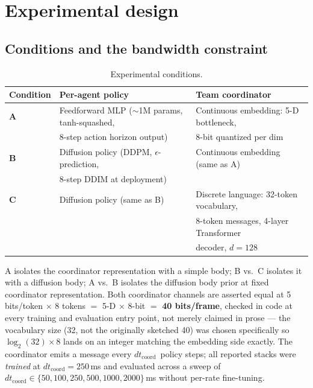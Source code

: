 \documentclass[11pt]{article}
\newcommand{\dtcoord}{\ensuremath{dt_{\mathrm{coord}}}}
\begin{document}
\section{Experimental design}

\subsection{Conditions and the bandwidth constraint}
\label{sec:conditions}

\begin{table}[ht]
\centering
\small
\begin{tabular}{@{}lll@{}}
\toprule
Condition & Per-agent policy & Team coordinator \\
\midrule
\textbf{A} & Feedforward MLP ($\sim$1M params, tanh-squashed, & Continuous embedding: 5-D bottleneck, \\
           & 8-step action horizon output)                    & 8-bit quantized per dim \\
\textbf{B} & Diffusion policy (DDPM, $\epsilon$-prediction,   & Continuous embedding (same as A) \\
           & 8-step DDIM at deployment)                       & \\
\textbf{C} & Diffusion policy (same as B)                     & Discrete language: 32-token vocabulary, \\
           &                                                  & 8-token messages, 4-layer Transformer \\
           &                                                  & decoder, $d=128$ \\
\bottomrule
\end{tabular}
\caption{Experimental conditions.}
\label{tab:conditions}
\end{table}

A isolates the coordinator representation with a simple body; B vs.\ C
isolates it with a diffusion body; A vs.\ B isolates the diffusion body
prior at fixed coordinator representation. Both coordinator channels are
asserted equal at 5 bits/token $\times$ 8 tokens $=$ 5-D $\times$ 8-bit
$=$ \textbf{40 bits/frame}, checked in code at every training and
evaluation entry point, not merely claimed in prose --- the vocabulary
size (32, not the originally sketched 40) was chosen specifically so
$\log_2(32) \times 8$ lands on an integer matching the embedding side
exactly. The coordinator emits a message every \dtcoord\ policy steps;
all reported stacks were \emph{trained} at $\dtcoord = 250$\,ms and
evaluated across a sweep of $\dtcoord \in \{50, 100, 250, 500, 1000,
2000\}$\,ms without per-rate fine-tuning.
\end{document}
